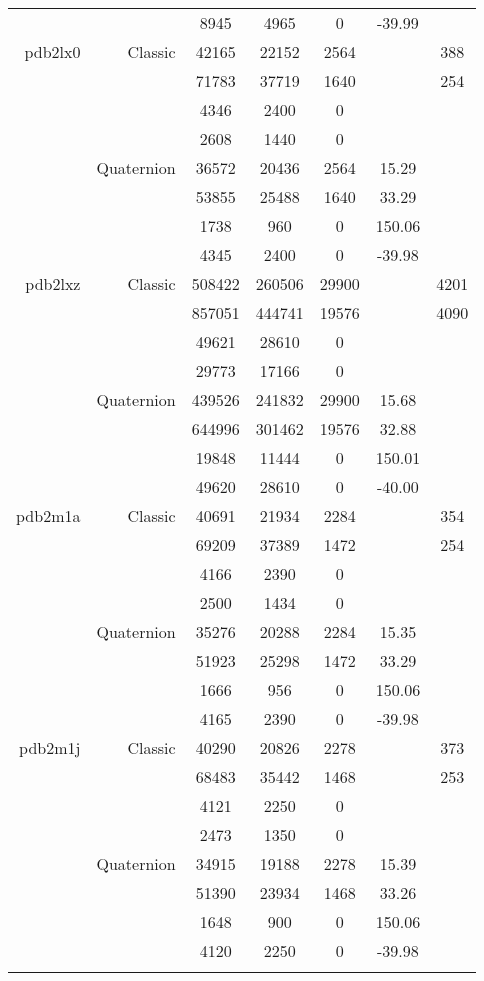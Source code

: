 \begin{xltabular}{\textwidth}{r|rcccSc}
& & 8945 & 4965 & 0 & -39.99 & \\ \addlinespace
pdb2lx0 & Classic & 42165 & 22152 & 2564 & & 388 \\
& & 71783 & 37719 & 1640 & & 254 \\
& & 4346 & 2400 & 0 & & \\
& & 2608 & 1440 & 0 & & \\
& Quaternion & 36572 & 20436 & 2564 & 15.29 & \\
& & 53855 & 25488 & 1640 & 33.29 & \\
& & 1738 & 960 & 0 & 150.06 & \\
& & 4345 & 2400 & 0 & -39.98 & \\ \addlinespace
pdb2lxz & Classic & 508422 & 260506 & 29900 & & 4201 \\
& & 857051 & 444741 & 19576 & & 4090 \\
& & 49621 & 28610 & 0 & & \\
& & 29773 & 17166 & 0 & & \\
& Quaternion & 439526 & 241832 & 29900 & 15.68 & \\
& & 644996 & 301462 & 19576 & 32.88 & \\
& & 19848 & 11444 & 0 & 150.01 & \\
& & 49620 & 28610 & 0 & -40.00 & \\ \addlinespace
pdb2m1a & Classic & 40691 & 21934 & 2284 & & 354 \\
& & 69209 & 37389 & 1472 & & 254 \\
& & 4166 & 2390 & 0 & & \\
& & 2500 & 1434 & 0 & & \\
& Quaternion & 35276 & 20288 & 2284 & 15.35 & \\
& & 51923 & 25298 & 1472 & 33.29 & \\
& & 1666 & 956 & 0 & 150.06 & \\
& & 4165 & 2390 & 0 & -39.98 & \\ \addlinespace
pdb2m1j & Classic & 40290 & 20826 & 2278 & & 373 \\
& & 68483 & 35442 & 1468 & & 253 \\
& & 4121 & 2250 & 0 & & \\
& & 2473 & 1350 & 0 & & \\
& Quaternion & 34915 & 19188 & 2278 & 15.39 & \\
& & 51390 & 23934 & 1468 & 33.26 & \\
& & 1648 & 900 & 0 & 150.06 & \\
& & 4120 & 2250 & 0 & -39.98 & \\ \addlinespace

\end{xltabular}
